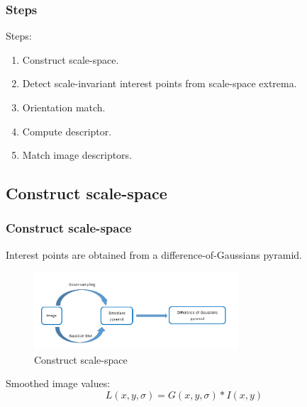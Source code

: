 \documentclass[notheorems, serif, table, compress]{beamer}  %
\begin{document}
\begin{frame}[fragile]
\frametitle{Steps}

Steps:
\begin{enumerate}
\item Construct scale-space.

\item Detect scale-invariant interest points from scale-space extrema. %

\item Orientation match.%

\item Compute descriptor.%

\item Match image descriptors.%
\end{enumerate}
\end{frame}

\subsection{Construct scale-space}
\begin{frame}[fragile]
\frametitle{Construct scale-space}
Interest points are obtained from a difference-of-Gaussians pyramid. %


\begin{figure}[!ht]
  \centering\includegraphics[width=3in]{pyramid.png}
  \caption{Construct scale-space}
 \label{step}
  \end{figure}

Smoothed image values:%
\begin{equation}
L(x,y,\sigma)=G(x,y,\sigma)*I(x,y)
\end{equation}

\end{frame}
\end{document}
